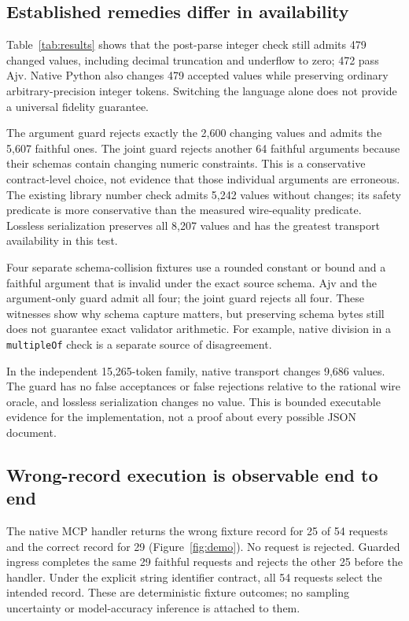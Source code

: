 \documentclass[11pt]{article}
\begin{document}
\begin{table}[t]
\centering\footnotesize\setlength{\tabcolsep}{3pt}
\caption{Results on 8,207 distinct exact-valid pairs. ``Changed'' counts accepted outputs whose mathematical value differs from the source. SDK and native JavaScript outputs agree. Lossless wrappers require compatible downstream handling.}
\label{tab:results}
\end{table}

\subsection{Established remedies differ in availability}
Table~\ref{tab:results} shows that the post-parse integer check still admits 479 changed values, including decimal truncation and underflow to zero; 472 pass Ajv. Native Python also changes 479 accepted values while preserving ordinary arbitrary-precision integer tokens. Switching the language alone does not provide a universal fidelity guarantee.

The argument guard rejects exactly the 2,600 changing values and admits the 5,607 faithful ones. The joint guard rejects another 64 faithful arguments because their schemas contain changing numeric constraints. This is a conservative contract-level choice, not evidence that those individual arguments are erroneous. The existing library number check admits 5,242 values without changes; its safety predicate is more conservative than the measured wire-equality predicate. Lossless serialization preserves all 8,207 values and has the greatest transport availability in this test.

Four separate schema-collision fixtures use a rounded constant or bound and a faithful argument that is invalid under the exact source schema. Ajv and the argument-only guard admit all four; the joint guard rejects all four. These witnesses show why schema capture matters, but preserving schema bytes still does not guarantee exact validator arithmetic. For example, native division in a \texttt{multipleOf} check is a separate source of disagreement.

In the independent 15,265-token family, native transport changes 9,686 values. The guard has no false acceptances or false rejections relative to the rational wire oracle, and lossless serialization changes no value. This is bounded executable evidence for the implementation, not a proof about every possible JSON document.

\subsection{Wrong-record execution is observable end to end}
The native MCP handler returns the wrong fixture record for 25 of 54 requests and the correct record for 29 (Figure~\ref{fig:demo}). No request is rejected. Guarded ingress completes the same 29 faithful requests and rejects the other 25 before the handler. Under the explicit string identifier contract, all 54 requests select the intended record. These are deterministic fixture outcomes; no sampling uncertainty or model-accuracy inference is attached to them.
\end{document}

